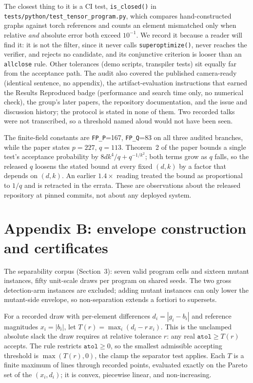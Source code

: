 \documentclass[twocolumn,10pt]{article}
\newcommand{\atol}{\texttt{atol}}
\begin{document}
The closest thing to it is a CI test, \texttt{is\_closed()} in
\texttt{tests/python/test\_tensor\_program.py}, which compares
hand-constructed graphs against torch references and counts an element
mismatched only when relative \emph{and} absolute error both exceed
$10^{-1}$. We record it because a reader will find it: it is not the
filter, since it never calls \texttt{superoptimize()}, never reaches the
verifier, and rejects no candidate, and its conjunctive criterion is
looser than an \texttt{allclose} rule. Other tolerances (demo scripts,
transpiler tests) sit equally far from the acceptance path. The audit
also covered the published camera-ready (identical sentence, no
appendix), the artifact-evaluation instructions that earned the Results
Reproduced badge (performance and search time only, no numerical check),
the group's later papers, the repository documentation, and the issue
and discussion history; the protocol is stated in none of them. Two
recorded talks were not transcribed, so a threshold named aloud would
not have been seen.

The finite-field constants are \texttt{FP\_P}=167, \texttt{FP\_Q}=83 on
all three audited branches, while the paper states $p{=}227$, $q{=}113$.
Theorem~2 of the paper bounds a single test's acceptance probability by
$8dk^{4}/q + q^{-1/k^{2}}$; both terms grow as $q$ falls, so the
released $q$ loosens the stated bound at every fixed $(d, k)$ by a
factor that depends on $(d, k)$. An earlier $1.4\times$ reading treated
the bound as proportional to $1/q$ and is retracted in the errata. These
are observations about the released repository at pinned commits, not
about any deployed system.

\section*{Appendix B: envelope construction and certificates}

The separability corpus (Section~3): seven valid program cells and
sixteen mutant instances, fifty unit-scale draws per program on shared
seeds. The two gross detection-arm instances are excluded; adding mutant
instances can only lower the mutant-side envelope, so non-separation
extends a fortiori to supersets.

For a recorded draw with per-element differences $d_i = |g_i - b_i|$ and
reference magnitudes $x_i = |b_i|$, let $T(r) = \max_i (d_i - r\,x_i)$.
This is the unclamped absolute slack the draw requires at relative
tolerance $r$: any real $\atol \ge T(r)$ accepts. The rule restricts
$\atol \ge 0$, so the smallest admissible accepting threshold is
$\max(T(r), 0)$, the clamp the separator test applies. Each $T$ is a
finite maximum of lines through recorded points, evaluated exactly on
the Pareto set of the $(x_i, d_i)$; it is convex, piecewise linear, and
non-increasing.
\end{document}
